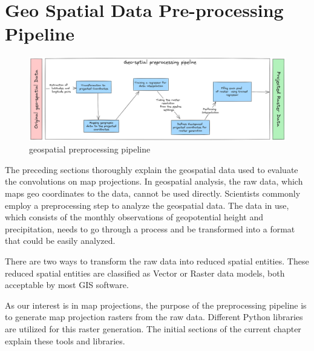 
\clearpage
\cleardoublepage

\chapter{Geo Spatial Data Pre-processing Pipeline}
\label{chap:preprocess}
\begin{figure}[h]
    \centering
    \includegraphics[width=1.0\linewidth]{figures/chapter-7/preprocessing_pipeline.png}
    \caption{geospatial preprocessing pipeline}
    \label{fig:preprocessingpipeline}
\end{figure}
The preceding sections thoroughly explain the geospatial data used to evaluate the convolutions on map projections. In geospatial analysis, the raw data, which maps geo coordinates to the data, cannot be used directly. Scientists commonly employ a preprocessing step to analyze the geospatial data. The data in use, which consists of the monthly observations of geopotential height and precipitation, needs to go through a process and be transformed into a format that could be easily analyzed.

There are two ways to transform the raw data into reduced spatial entities. These reduced spatial entities are classified as Vector or Raster data models, both acceptable by most GIS software.

As our interest is in map projections, the purpose of the preprocessing pipeline is to generate map projection rasters from the raw data. Different Python libraries are utilized for this raster generation. The initial sections of the current chapter explain these tools and libraries.

